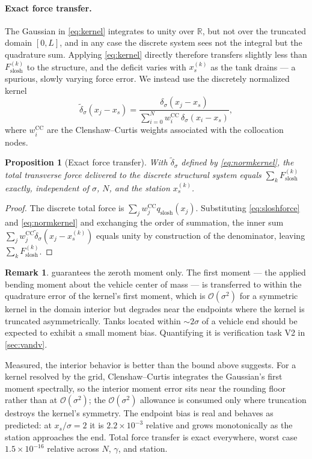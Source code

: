 \documentclass[11pt,a4paper]{article}
\newtheorem{proposition}[theorem]{Proposition}
\theoremstyle{definition}
\newtheorem{remark}[theorem]{Remark}
\numberwithin{equation}{section}
\newcommand{\R}{\mathbb{R}}
\begin{document}
\paragraph{Exact force transfer.} The Gaussian in \cref{eq:kernel} integrates to unity over $\R$, but not over the truncated domain $[0,L]$, and in any case the discrete system sees not the integral but the quadrature sum. Applying \cref{eq:kernel} directly therefore transfers slightly less than $F_{\text{slosh}}^{(k)}$ to the structure, and the deficit varies with $x_s^{(k)}$ as the tank drains --- a spurious, slowly varying force error. We instead use the discretely normalized kernel
\begin{equation}
\label{eq:normkernel}
\tilde{\delta}_\sigma(x_j - x_s) = \frac{\delta_\sigma(x_j - x_s)}{\displaystyle\sum_{i=0}^{N} w_i^{\text{CC}}\, \delta_\sigma(x_i - x_s)},
\end{equation}
where $w_i^{\text{CC}}$ are the Clenshaw--Curtis weights associated with the collocation nodes.

\begin{proposition}[Exact force transfer]
\label{prop:force}
With $\tilde{\delta}_\sigma$ defined by \cref{eq:normkernel}, the total transverse force delivered to the discrete structural system equals $\sum_k F_{\text{slosh}}^{(k)}$ exactly, independent of $\sigma$, $N$, and the station $x_s^{(k)}$.
\end{proposition}

\begin{proof}
The discrete total force is $\sum_j w_j^{\text{CC}} q_{\text{slosh}}(x_j)$. Substituting \cref{eq:sloshforce} and \cref{eq:normkernel} and exchanging the order of summation, the inner sum $\sum_j w_j^{\text{CC}} \tilde{\delta}_\sigma(x_j - x_s^{(k)})$ equals unity by construction of the denominator, leaving $\sum_k F_{\text{slosh}}^{(k)}$.
\end{proof}

\begin{remark}
 guarantees the zeroth moment only. The first moment --- the applied bending moment about the vehicle center of mass --- is transferred to within the quadrature error of the kernel's first moment, which is $\mathcal{O}(\sigma^2)$ for a symmetric kernel in the domain interior but degrades near the endpoints where the kernel is truncated asymmetrically. Tanks located within $\sim 2\sigma$ of a vehicle end should be expected to exhibit a small moment bias. Quantifying it is verification task V2 in \cref{sec:vandv}.

Measured, the interior behavior is better than the bound above suggests. For a kernel resolved by the grid, Clenshaw--Curtis integrates the Gaussian's first moment spectrally, so the interior moment error sits near the rounding floor rather than at $\mathcal{O}(\sigma^2)$; the $\mathcal{O}(\sigma^2)$ allowance is consumed only where truncation destroys the kernel's symmetry. The endpoint bias is real and behaves as predicted: at $x_s/\sigma = 2$ it is $2.2\times10^{-3}$ relative and grows monotonically as the station approaches the end. Total force transfer is exact everywhere, worst case $1.5\times10^{-16}$ relative across $N$, $\gamma$, and station.
\end{remark}
\end{document}
